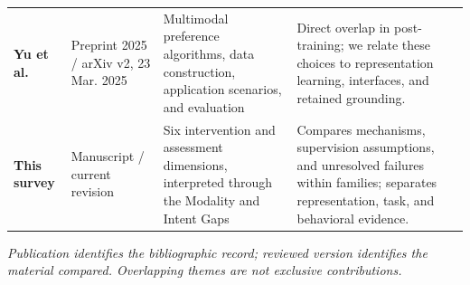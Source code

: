 \begin{table}[t]
\begin{tabularx}{\textwidth}{>{\raggedright\arraybackslash}p{}>{\raggedright\arraybackslash}p{}>{\raggedright\arraybackslash}X>{\raggedright\arraybackslash}X}
\textbf{Yu et al.}~\cite{yu2025preferencesurvey} & Preprint 2025 / arXiv v2, 23 Mar. 2025 & Multimodal preference algorithms, data construction, application scenarios, and evaluation & Direct overlap in post-training; we relate these choices to representation learning, interfaces, and retained grounding. \\
\textbf{This survey} & Manuscript / current revision & Six intervention and assessment dimensions, interpreted through the Modality and Intent Gaps & Compares mechanisms, supervision assumptions, and unresolved failures within families; separates representation, task, and behavioral evidence. \\
\bottomrule
\end{tabularx}
\par\smallskip
{\raggedright\footnotesize\itshape Publication identifies the bibliographic record; reviewed version identifies the material compared. Overlapping themes are not exclusive contributions.\par}
\end{table}
